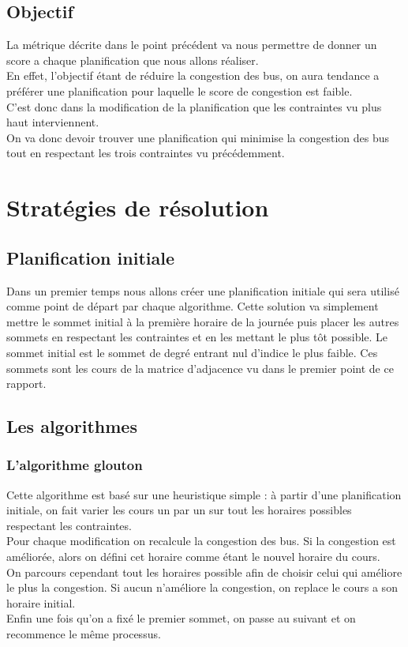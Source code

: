 \documentclass[a4paper,11pt]{article}
\begin{document}
	\subsection{Objectif}
		La métrique décrite dans le point précédent va nous permettre de donner un score a chaque planification que nous allons réaliser.\\
		En effet, l'objectif étant de réduire la congestion des bus, on aura tendance a préférer une planification pour laquelle le score de congestion est faible.\\
		C'est donc dans la modification de la planification que les contraintes vu plus haut interviennent.\\
		On va donc devoir trouver une planification qui minimise la congestion des bus tout en respectant les trois contraintes vu précédemment.
	
\section{Stratégies de résolution}
	\subsection{Planification initiale}
		Dans un premier temps nous allons créer une planification initiale qui sera utilisé comme point de départ par chaque algorithme.
		Cette solution va simplement mettre le sommet initial à la première horaire de la journée puis placer les autres sommets en respectant les contraintes et en les mettant le plus tôt possible.
		Le sommet initial est le sommet de degré entrant nul d'indice le plus faible.
		Ces sommets sont les cours de la matrice d'adjacence vu dans le premier point de ce rapport.
	\subsection{Les algorithmes}
		\subsubsection{L'algorithme glouton}
		Cette algorithme est basé sur une heuristique simple : à partir d'une planification initiale, on fait varier les cours un par un sur tout les horaires possibles respectant les contraintes.\\
		Pour chaque modification on recalcule la congestion des bus. Si la congestion est améliorée, alors on défini cet horaire comme étant le nouvel horaire du cours.\\
		On parcours cependant tout les horaires possible afin de choisir celui qui améliore le plus la congestion. Si aucun n'améliore la congestion, on replace le cours a son horaire initial.\\
		Enfin une fois qu'on a fixé le premier sommet, on passe au suivant et on recommence le même processus.
\end{document}
